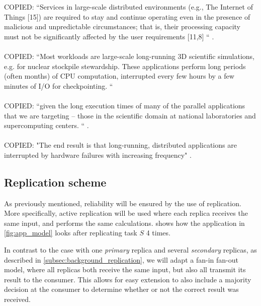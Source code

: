 \documentclass{cslthse-msc}
\begin{document}
COPIED:
“Services in large-scale distributed environments (e.g., The Internet of Things [15]) are required to stay and continue operating even in the presence of malicious and unpredictable circumstances; that is, their processing capacity must not be significantly affected by the user requirements [11,8] “ \cite{imprRelAdaptRL}.
\\\\
COPIED: “Most workloads are large-scale long-running 3D scientific simulations, e.g. for nuclear stockpile stewardship. These applications perform long periods (often months) of CPU computation, interrupted every few hours by a few minutes of I/O for checkpointing. “  \cite{studyOfFailures}
\\\\
COPIED: “given the long execution times of many of the parallel applications that we are targeting – those in the scientific domain at national laboratories and supercomputing centers. “  \cite{implicationsOfFailures}. 
\\\\
COPIED: "The end result is that long-running, distributed applications are interrupted by hardware failures with increasing frequency"  \cite{surveyFaultParallel}.

\fi

\subsection{Replication scheme} \label{subsec:design_repl_scheme}
As previously mentioned, reliability will be ensured by the use of replication. More specifically, active replication will be used where each replica receives the same input, and performs the same calculations.  shows how the application in \cref{fig:app_model} looks after replicating task $S$ 4 times.

In contrast to the case with one \emph{primary} replica and several \emph{secondary} replicas, as described in \cref{subsec:background_replication}, we will adapt a fan-in fan-out model, where all replicas both receive the same input, but also all transmit its result to the consumer. This allows for easy extension to also include a majority decision at the consumer to determine whether or not the correct result was received. %
\end{document}
